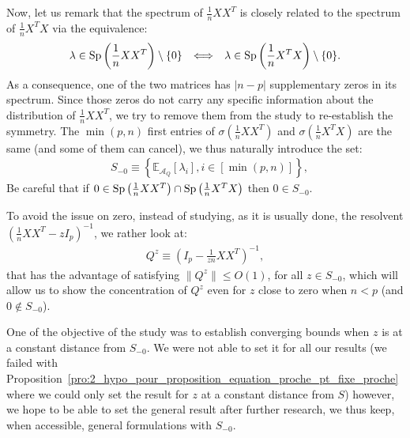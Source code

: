 \documentclass[a4papaer, titlepage]{book}
\begin{document}
Now, let us remark that the spectrum of $\frac{1}{n}XX^T$ is closely related to the spectrum of $\frac{1}{n}X^TX$ via the equivalence:
\begin{align*}
   \lambda \in \operatorname{Sp} \left(\frac{1}{n}XX^T\right) \setminus \{0\}&
   &\Longleftrightarrow&
   &\lambda \in \operatorname{Sp} \left(\frac{1}{n}X^TX\right) \setminus \{0\}.
 \end{align*} 
 As a consequence, one of the two matrices has $|n-p|$ supplementary zeros in its spectrum. Since those zeros do not carry any specific information about the distribution of $\frac{1}{n}XX^T$, we try to remove them from the study to re-establish the symmetry. The $\min(p,n)$ first entries of $\sigma(\frac{1}{n}XX^T)$ and $\sigma(\frac{1}{n}X^TX)$ are the same (and some of them can cancel), we thus naturally introduce the set:
 \begin{align*}
    & S_{-0} 
    \equiv \left\{\mathbb E_{\mathcal A_Q}[\lambda_i], i\in [\min(p,n)] \right\},
  \end{align*} 
  Be careful that if $0 \in \operatorname{Sp} \left(\frac{1}{n}XX^T\right) \cap \operatorname{Sp} \left(\frac{1}{n}X^TX\right)$ then $0 \in S_{-0}$.

  To avoid the issue on zero, instead of studying, as it is usually done, the resolvent $(\frac{1}{n}XX^T- zI_p)^{-1}$, we rather look at:
  \begin{align*}
    Q^z\equiv \left(I_p - \frac{1}{zn}XX^T\right)^{-1},
  \end{align*}
  that has the advantage of satisfying $\|Q^z\| \leq O(1)$, for all $z \in S_{-0}$, which will allow us to show the concentration of $Q^z$ even for $z$ close to zero when $n<p$ (and $0 \notin S_{-0}$).

  One of the objective of the study was to establish converging bounds when $z$ is at a constant distance from $S_{-0}$. We were not able to set it for all our results (we failed with Proposition~\ref{pro:2_hypo_pour_proposition_equation_proche_pt_fixe_proche} where we could only set the result for $z$ at a constant distance from $S$) however, we hope to be able to set the general result after further research, we thus keep, when accessible, general formulations with $S_{-0}$.  
\end{document}
